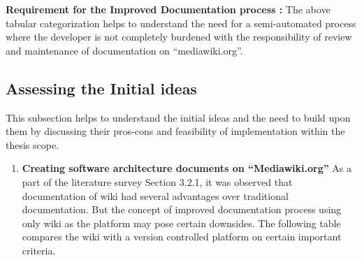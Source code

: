 \textbf{Requirement for the Improved Documentation process : }The above tabular categorization helps to understand the need for a semi-automated process where the developer is not completely burdened with the responsibility of review and maintenance of documentation on \enquote{mediawiki.org}.


\subsection{Assessing the Initial ideas }

This subsection helps to understand the initial ideas and the need to build upon them by discussing their pros-cons and feasibility of implementation within the thesis scope.


\begin{enumerate}

\item \textbf{Creating software architecture documents on \enquote{Mediawiki.org}}
\indent As a part of the literature survey Section 3.2.1, it was observed that documentation of wiki had several advantages over traditional documentation. But the concept of improved documentation process using only wiki as the platform may pose certain downsides. The following table compares the wiki with a version controlled platform on certain important criteria.


\end{enumerate}
